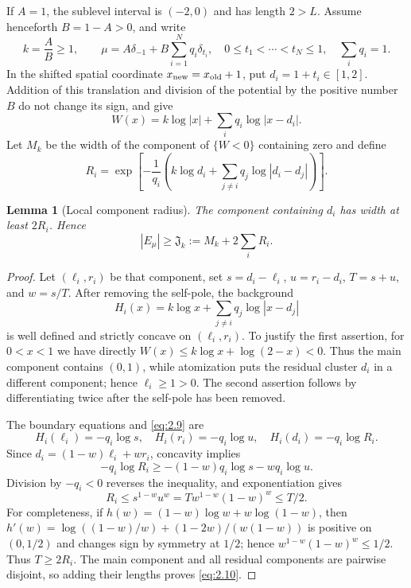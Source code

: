 \documentclass[11pt]{article}
\numberwithin{equation}{section}
\theoremstyle{plain}
\newtheorem{lemma}[theorem]{Lemma}
\theoremstyle{definition}
\theoremstyle{remark}
\newcommand{\1}{\mathbf 1}
\newcommand{\J}{\mathfrak J}
\begin{document}
If $A=1$, the sublevel interval is $(-2,0)$ and has length $2>L$.
Assume henceforth $B=1-A>0$, and write
\begin{equation}
 k=\frac AB\ge1,\qquad
 \mu=A\delta_{-1}+B\sum_{i=1}^Nq_i\delta_{t_i},
 \quad 0\le t_1<\cdots<t_N\le1,
 \quad\sum_iq_i=1.
\label{eq:2.7}
\end{equation}
In the shifted spatial coordinate $x_{\rm new}=x_{\rm old}+1$, put
$d_i=1+t_i\in[1,2]$.  Addition of this translation and division of the
potential by the positive number $B$ do not change its sign, and give
\begin{equation}
 W(x)=k\log|x|+\sum_iq_i\log|x-d_i|.
\label{eq:2.8}
\end{equation}
Let $M_k$ be the width of the component of $\{W<0\}$ containing zero and
define
\begin{equation}
 R_i=\exp\left[-\frac1{q_i}\left(k\log d_i+
              \sum_{j\ne i}q_j\log|d_i-d_j|\right)\right].
\label{eq:2.9}
\end{equation}

\begin{lemma}[Local component radius]\label{lem:radius}
The component containing $d_i$ has width at least $2R_i$.  Hence
\begin{equation}
 |E_\mu|\ge \J_k:=M_k+2\sum_iR_i.
\label{eq:2.10}
\end{equation}
\end{lemma}

\begin{proof}
Let $(\ell_i,r_i)$ be that component, set
$s=d_i-\ell_i$, $u=r_i-d_i$, $T=s+u$, and $w=s/T$.  After removing the
self-pole, the background
\[
 H_i(x)=k\log x+\sum_{j\ne i}q_j\log|x-d_j|
\]
is well defined and strictly concave on $(\ell_i,r_i)$.  To justify the
first assertion, for $0<x<1$ we have directly
$W(x)\le k\log x+\log(2-x)<0$.  Thus the main component contains
$(0,1)$, while atomization puts the residual cluster $d_i$ in a different
component; hence $\ell_i\ge1>0$.  The second assertion follows
by differentiating twice after the self-pole has been removed.

The boundary equations and \eqref{eq:2.9} are
\[
 H_i(\ell_i)=-q_i\log s,\quad
 H_i(r_i)=-q_i\log u,\quad
 H_i(d_i)=-q_i\log R_i.
\]
Since $d_i=(1-w)\ell_i+wr_i$, concavity implies
\[
 -q_i\log R_i
 \ge-(1-w)q_i\log s-wq_i\log u.
\]
Division by $-q_i<0$ reverses the inequality, and exponentiation gives
\[
 R_i\le s^{1-w}u^w
 =T w^{1-w}(1-w)^w\le T/2.
\]
For completeness, if
$h(w)=(1-w)\log w+w\log(1-w)$, then
$h'(w)=\log((1-w)/w)+(1-2w)/(w(1-w))$ is positive on
$(0,1/2)$ and changes sign by symmetry at $1/2$; hence
$w^{1-w}(1-w)^w\le1/2$.  Thus $T\ge2R_i$.  The main component and all
residual components are pairwise disjoint, so adding their lengths proves
\eqref{eq:2.10}.
\end{proof}
\end{document}
